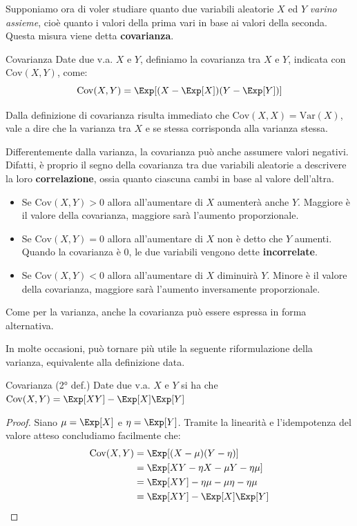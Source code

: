\documentclass[a4paper, 12pt]{report}
\begin{document}
    Supponiamo ora di voler studiare quanto due variabili aleatorie $X$ ed $Y$ \textit{varino assieme}, cioè quanto i valori della prima vari in base ai valori della seconda. Questa misura viene detta \textbf{covarianza}.

    \begin{frameddefn}{Covarianza}
        Date due v.a. $X$ e $Y$, definiamo la covarianza tra $X$ e $Y$, indicata con $\mathrm{Cov}(X,Y)$, come:
        \[\mathrm{Cov}(X,Y) = \Exp[(X-\Exp[X])(Y-\Exp[Y])]\]
    \end{frameddefn}

    Dalla definizione di covarianza risulta immediato che $\mathrm{Cov}(X,X) = \mathrm{Var}(X)$, vale a dire che la varianza tra $X$ e se stessa corrisponda alla varianza stessa.

    Differentemente dalla varianza, la covarianza può anche assumere valori negativi. Difatti, è proprio il segno della covarianza tra due variabili aleatorie a descrivere la loro \textbf{correlazione}, ossia quanto ciascuna cambi in base al valore dell'altra.
    \begin{itemize}
        \item Se $\mathrm{Cov}(X,Y) > 0$ allora all'aumentare di $X$ aumenterà anche $Y$. Maggiore è il valore della covarianza, maggiore sarà l'aumento proporzionale.
        \item Se $\mathrm{Cov}(X,Y) = 0$ allora all'aumentare di $X$ non è detto che $Y$ aumenti. Quando la covarianza è 0, le due variabili vengono dette \textbf{incorrelate}.
        \item Se $\mathrm{Cov}(X,Y) < 0$ allora all'aumentare di $X$ diminuirà $Y$. Minore è il valore della covarianza, maggiore sarà l'aumento inversamente proporzionale.
    \end{itemize}

    Come per la varianza, anche la covarianza può essere espressa in forma alternativa.

    In molte occasioni, può tornare più utile la seguente riformulazione della varianza, equivalente alla definizione data.

    \begin{framedthm}{Covarianza (2° def.)}
        Date due v.a. $X$ e $Y$ si ha che $\mathrm{Cov}(X,Y) = \Exp[XY]-\Exp[X]\Exp[Y]$
    \end{framedthm}

    \begin{proof}
        Siano $\mu = \Exp[X]$ e $\eta = \Exp[Y]$. Tramite la linearità e l'idempotenza del valore atteso concludiamo facilmente che:
        \[\begin{split}
            \mathrm{Cov}(X,Y) &= \Exp[(X-\mu)(Y-\eta)] \\
            &= \Exp[XY - \eta X - \mu Y - \eta\mu] \\
            &= \Exp[XY] - \eta \mu- \mu \eta - \eta\mu \\
            &= \Exp[XY] - \Exp[X]\Exp[Y] \\
        \end{split}\]
    \end{proof}
\end{document}
